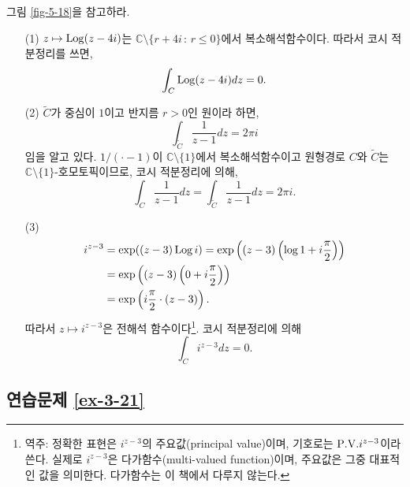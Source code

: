 그림 \ref{fig-5-18}을 참고하라.

\begin{itemize}
\item[(1)]  $z\mapsto \mathop{\mathrm{Log}}(z-4i)$는 $\mathbb C \setminus \{r+4i \,:\, r\le0\}$에서
복소해석함수이다. 따라서 코시 적분정리를 쓰면,
\[
\int_C \mathop{\mathrm{Log}} (z-4i)dz = 0.
\]
\item[(2)] $\tilde C$가 중심이 $1$이고 반지름 $r>0$인 원이라 하면,
\[
\int_{\tilde C} \dfrac1{z-1} dz = 2\pi i
\]
임을 알고 있다.
$1/(\cdot -1)$이 $\mathbb C\setminus\{1\}$에서 복소해석함수이고
원형경로 $C$와 $\tilde C$는 $\mathbb C\setminus\{1\}$-호모토픽이므로,
코시 적분정리에 의해,
\[
\int_C \dfrac1{z-1} dz = \int_{\tilde C} \dfrac1{z-1}dz = 2\pi i.
\]
\item[(3)] 
\begin{align*}
i^{z-3} &= \exp((z-3)\mathop{\mathrm{Log}} i) = \exp\left( (z-3)\left( \log 1 + i\displaystyle\frac\pi2\right)\right) \\
&= \exp\left( (z-3)\left(0+i\displaystyle\frac\pi2\right)\right) \\
&= \exp\left( i\displaystyle\frac\pi2 \cdot(z-3)\right).
\end{align*}
따라서 $z\mapsto i^{z-3}$은 전해석 함수이다\footnote{
역주: 정확한 표현은 $i^{z-3}$의 주요값(principal value)이며, 기호로는 $\PV i^{z-3}$이라 쓴다.
실제로 $i^{z-3}$은 다가함수(multi-valued function)이며, 주요값은 그중 대표적인 값을 의미한다.
다가함수는 이 책에서 다루지 않는다.
}.
코시 적분정리에 의해
\[
\int_C i^{z-3}dz = 0.
\]
\end{itemize}

\subsection*{연습문제 \ref{ex-3-21}}

